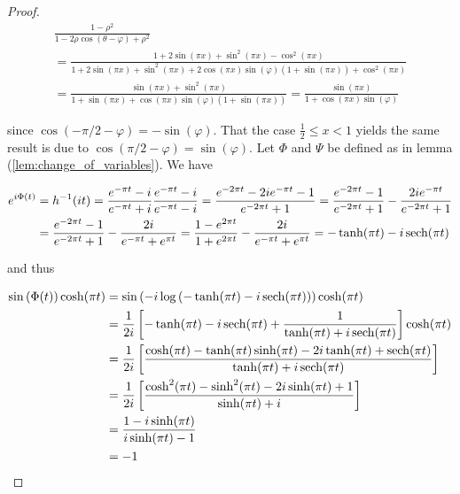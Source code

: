 \begin{proof}
\begin{multline*}
	\frac{1 - \rho^2}{1 - 2\rho\cos(\theta - \varphi) + \rho^2} \\= \frac{1 + 2\sin(\pi x) + \sin^2(\pi x) - \cos^2(\pi x)}{1 + 2\sin(\pi x) + \sin^2(\pi x) + 2\cos(\pi x)\sin(\varphi)(1 + \sin(\pi x)) + \cos^2(\pi x)}\\
	= \frac{\sin(\pi x) + \sin^2(\pi x)}{1 + \sin(\pi x) + \cos(\pi x)\sin(\varphi)(1 + \sin(\pi x))}
	= \frac{\sin(\pi x)}{1 + \cos(\pi x)\sin(\varphi)}
\end{multline*}

	since $\cos\left( -\pi/2 - \varphi \right) = -\sin(\varphi)$. That the case $\frac{1}{2} \leqslant x < 1$ yields the same result is due to $\cos(\pi/2 - \varphi) = \sin(\varphi)$. Let $\Phi$ and $\Psi$ be defined as in lemma (\ref{lem:change_of_variables}). We have 
				
\begin{gather*}
	\begin{aligned}
		e^{i\Phi(t)} &= h^{-1}(it) = \frac{e^{-\pi t} - i}{e^{-\pi t} + i} \frac{e^{-\pi t} - i}{e^{-\pi t} - i} = \frac{e^{-2\pi t} - 2ie^{-\pi t} - 1}{e^{-2\pi t} + 1} = \frac{e^{-2\pi t} - 1}{e^{-2\pi t} + 1} - \frac{2ie^{-\pi t}}{e^{-2\pi t} + 1}\\ 
		&= \frac{e^{-2\pi t} - 1}{e^{-2\pi t} + 1} - \frac{2i}{e^{-\pi t} + e^{\pi t}} = \frac{1 - e^{2\pi t}}{1 + e^{2\pi t}} - \frac{2i}{e^{-\pi t} + e^{\pi t}} = -\tanh (\pi t) - i \operatorname{sech}(\pi t)
	\end{aligned}
\end{gather*}
	
and thus

\begin{gather*}
	\begin{aligned}
		\sin\left( \Phi(t) \right)\cosh(\pi t) &= \sin\left( -i\log\left( -\tanh (\pi t) - i \operatorname{sech}(\pi t) \right)\right) \cosh(\pi t)\\
		&= \frac{1}{2i} \left[ -\tanh(\pi t) - i\operatorname{sech}(\pi t) + \frac{1}{\tanh(\pi t) + i\operatorname{sech}(\pi t) }\right]\cosh(\pi t)\\
		&= \frac{1}{2i} \left[ \frac{\cosh(\pi t) - \tanh(\pi t) \sinh(\pi t) - 2i\tanh(\pi t) + \operatorname{sech}(\pi t)}{\tanh(\pi t) + i\operatorname{sech}(\pi t)}\right]\\
		&= \frac{1}{2i} \left[ \frac{\cosh^2(\pi t) - \sinh^2(\pi t) - 2i \sinh(\pi t) + 1}{\sinh(\pi t) + i}\right]\\
		&= \frac{1 - i\sinh(\pi t)}{i\sinh(\pi t) - 1}\\
		&= -1
	\end{aligned}
\end{gather*}


\end{proof}
